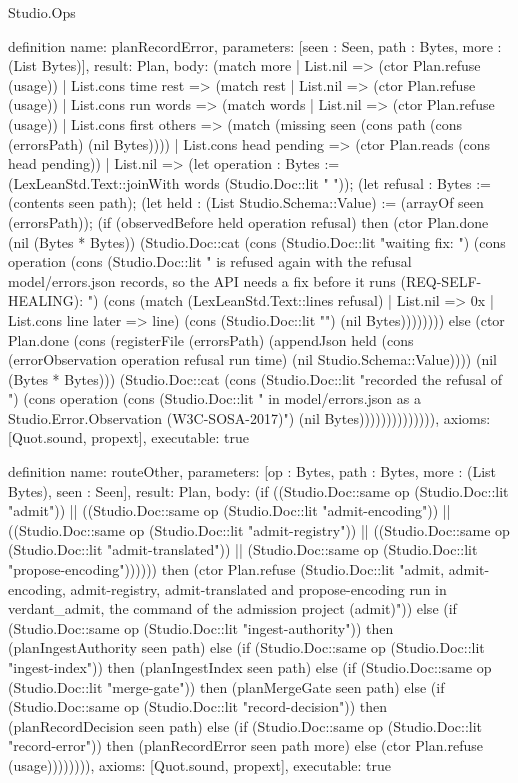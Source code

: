 \begin{lexlean}{Studio.Ops}
\begin{semanticmodule}
{definition{
  name: planRecordError,
  parameters: [seen : Seen, path : Bytes, more : (List Bytes)],
  result: Plan,
  body: (match more
    | List.nil => (ctor Plan.refuse (usage))
    | List.cons time rest => (match rest
      | List.nil => (ctor Plan.refuse (usage))
      | List.cons run words => (match words
        | List.nil => (ctor Plan.refuse (usage))
        | List.cons first others => (match (missing seen (cons path (cons (errorsPath) (nil Bytes))))
          | List.cons head pending => (ctor Plan.reads (cons head pending))
          | List.nil => (let operation : Bytes := (LexLeanStd.Text::joinWith words (Studio.Doc::lit " ")); (let refusal : Bytes := (contents seen path); (let held : (List Studio.Schema::Value) := (arrayOf seen (errorsPath)); (if (observedBefore held operation refusal) then (ctor Plan.done (nil (Bytes * Bytes)) (Studio.Doc::cat (cons (Studio.Doc::lit "waiting fix: ") (cons operation (cons (Studio.Doc::lit " is refused again with the refusal model/errors.json records, so the API needs a fix before it runs (REQ-SELF-HEALING): ") (cons (match (LexLeanStd.Text::lines refusal)
              | List.nil => 0x
              | List.cons line later => line) (cons (Studio.Doc::lit "\n") (nil Bytes)))))))) else (ctor Plan.done (cons (registerFile (errorsPath) (appendJson held (cons (errorObservation operation refusal run time) (nil Studio.Schema::Value)))) (nil (Bytes * Bytes))) (Studio.Doc::cat (cons (Studio.Doc::lit "recorded the refusal of ") (cons operation (cons (Studio.Doc::lit " in model/errors.json as a Studio.Error.Observation (W3C-SOSA-2017)\n") (nil Bytes)))))))))))))),
  axioms: [Quot.sound, propext],
  executable: true
}

definition{
  name: routeOther,
  parameters: [op : Bytes, path : Bytes, more : (List Bytes), seen : Seen],
  result: Plan,
  body: (if ((Studio.Doc::same op (Studio.Doc::lit "admit")) || ((Studio.Doc::same op (Studio.Doc::lit "admit-encoding")) || ((Studio.Doc::same op (Studio.Doc::lit "admit-registry")) || ((Studio.Doc::same op (Studio.Doc::lit "admit-translated")) || (Studio.Doc::same op (Studio.Doc::lit "propose-encoding")))))) then (ctor Plan.refuse (Studio.Doc::lit "admit, admit-encoding, admit-registry, admit-translated and propose-encoding run in verdant_admit, the command of the admission project (admit)\n")) else
    (if (Studio.Doc::same op (Studio.Doc::lit "ingest-authority")) then (planIngestAuthority seen path) else
    (if (Studio.Doc::same op (Studio.Doc::lit "ingest-index")) then (planIngestIndex seen path) else
    (if (Studio.Doc::same op (Studio.Doc::lit "merge-gate")) then (planMergeGate seen path) else
    (if (Studio.Doc::same op (Studio.Doc::lit "record-decision")) then (planRecordDecision seen path) else
    (if (Studio.Doc::same op (Studio.Doc::lit "record-error")) then (planRecordError seen path more) else
    (ctor Plan.refuse (usage)))))))),
  axioms: [Quot.sound, propext],
  executable: true
}

}
\end{semanticmodule}
\end{lexlean}
